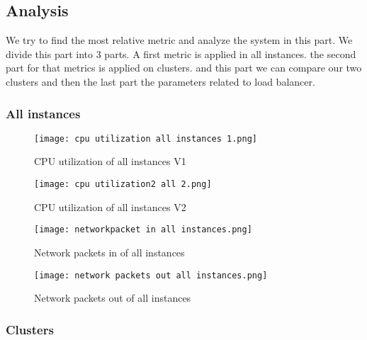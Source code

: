 \documentclass[12pt]{article}
\begin{document}
         \subsection{Analysis}
            We try to find the most relative metric and analyze the system in this part. We divide this part into 3 parts. A first metric is applied in all instances. the second part for that metrics is applied on clusters. and this part we can compare our two clusters and then the last part the parameters related to load balancer.

        

        \subsubsection{All instances}

          \begin{figure}[htpb]
        \centering
        \texttt{[image: cpu utilization all instances 1.png]}
            \caption{CPU utilization of all instances V1}
            \label{fig:cpu1}
        \end{figure}

         \begin{figure}[htpb]
        \centering
        \texttt{[image: cpu utilization2 all 2.png]}
            \caption{CPU utilization of all instances V2}
            \label{fig:cpu2}
        \end{figure}

         \begin{figure}[htpb]
        \centering
        \texttt{[image: networkpacket in all instances.png]}
            \caption{Network packets in of all instances}
            \label{fig:netin}
        \end{figure}

    \begin{figure}[htpb]
        \centering
        \texttt{[image: network packets out all instances.png]}
            \caption{Network packets out of all instances}
            \label{fig:netout}
        \end{figure}


        
        \subsubsection{Clusters}
\end{document}
